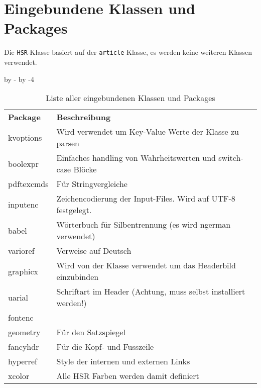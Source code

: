 \section{Eingebundene Klassen und Packages}

Die \verb+HSR+-Klasse basiert auf der \verb+article+ Klasse, es werden keine weiteren Klassen verwendet. 

\settowidth{\ci}{pdftexcmds}
\setlength{\cii}{\textwidth}
\advance\cii by -\ci
\advance\cii by -4\tabcolsep
\begin{table}[!hb]
\centering
{}
\begin{tabular}{p{\ci}p{\cii}}
	\rowcolor{HSRLakeGreen40}
	\textbf{Package} & \textbf{Beschreibung}
	\\
	kvoptions 	& Wird verwendet um Key-Value Werte der Klasse zu parsen
	\\
	boolexpr 	& Einfaches handling von Wahrheitswerten und switch-case Blöcke
	\\
	pdftexcmds	& Für Stringvergleiche
	\\
	inputenc	& Zeichencodierung der Input-Files. Wird auf UTF-8 festgelegt.
	\\
	babel		& Wörterbuch für Silbentrennung (es wird ngerman verwendet)
	\\
	varioref	& Verweise auf Deutsch
	\\
	graphicx	& Wird von der Klasse verwendet um das Headerbild einzubinden
	\\
	uarial		& Schriftart im Header (Achtung, muss selbst installiert werden!)
	\\
	fontenc		&
	\\
	geometry	& Für den Satzspiegel
	\\
	fancyhdr	& Für die Kopf- und Fusszeile
	\\
	hyperref	& Style der internen und externen Links
	\\
	xcolor		& Alle HSR Farben werden damit definiert
\end{tabular}
\caption{Liste aller eingebundenen Klassen und Packages}
\label{tab:KlassenPackages}
\end{table}